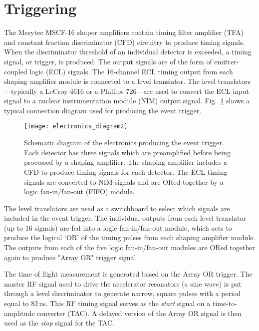 \section{Triggering}
The Mesytec MSCF-16 shaper amplifiers contain timing filter amplifier (TFA) and constant fraction discriminator (CFD) circuitry to produce timing signals.  When the discriminator threshold of an individual detector is exceeded, a timing  signal, or trigger, is produced.  The output signals are of the form of emitter-coupled logic (ECL) signals.  The 16-channel ECL timing output from each shaping amplifier module is connected to a level translator.  The level translators---typically a LeCroy 4616 or a Phillips 726---are used to convert the ECL input signal to a nuclear instrumentation module (NIM) output signal.  Fig.~\ref{emap2} shows a typical connection diagram used for producing the event trigger.

\begin{figure}
\centering
\texttt{[image: electronics\_diagram2]}%
\caption[Schematic diagram of the electronics producing the event trigger]{Schematic diagram of the electronics  producing the event trigger.  Each detector has three signals which are preamplified before being processed by a shaping amplifier.  The shaping amplifier includes a CFD to produce timing signals for each detector.  The ECL timing signals are converted to NIM signals and are ORed together by a logic fan-in/fan-out (FIFO) module.}%
\label{emap2}%
\end{figure}

The level translators are used as a switchboard to select which signals are included in the event trigger.  The individual outputs from each level translator (up to 16 signals) are fed into a logic fan-in/fan-out module, which acts to produce the logical `OR' of the timing pulses from each shaping amplifier module. The outputs from each of the five logic fan-in/fan-out modules are ORed together again to produce "Array OR" trigger signal.

The time of flight measurement is generated based on the Array OR trigger.  The master RF signal used to drive the accelerator resonators (a sine wave) is put through a level discriminator to generate narrow, square pulses with a period equal to 82\,ns.  This RF timing signal serves as the \textit{start} signal on a time-to-amplitude converter (TAC).  A delayed version of the Array OR signal is then used as the \textit{stop} signal for the TAC.

